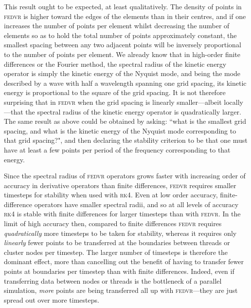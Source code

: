 This result ought to be expected, at least qualitatively. The density of points in \textsc{fedvr} is higher toward the edges of the elements than in their centres, and if one increases the number of points per element whilst decreasing the number of elements so as to hold the total number of points approximately constant, the smallest spacing between any two adjacent points will be inversely proportional to the number of points per element. We already know that in high-order finite differences or the Fourier method, the spectral radius of the kinetic energy operator is simply the kinetic energy of the Nyquist mode, and being the mode described by a wave with half a wavelength spanning one grid spacing, its kinetic energy is proportional to the square of the grid spacing. It is not therefore surprising that in \textsc{fedvr} when the grid spacing is linearly smaller---albeit locally---that the spectral radius of the kinetic energy operator is quadratically larger. The same result as above could be obtained by asking: ``what is the smallest grid spacing, and what is the kinetic energy of the Nyquist mode corresponding to that grid spacing?", and then declaring the stability criterion to be that one must have at least a few points per period of the frequency corresponding to that energy.

Since the spectral radius of \textsc{fedvr} operators grows faster with increasing order of accuracy in derivative operators than finite differences, \textsc{fedvr} requires smaller timesteps for stability when used with \textsc{rk4}. Even at low order accuracy, finite-difference operators have smaller spectral radii, and so at all levels of accuracy \textsc{rk4} is stable with finite differences for larger timesteps than with \textsc{fedvr}. In the limit of high accuracy then, compared to finite differences \textsc{fedvr} requires \emph{quadratically} more timesteps to be taken for stability, whereas it requires only \emph{linearly} fewer points to be transferred at the boundaries between threads or cluster nodes per timestep. The larger number of timesteps is therefore the dominant effect, more than cancelling out the benefit of having to transfer fewer points at boundaries per timestep than with finite differences. Indeed, even if transferring data between nodes or threads is the bottleneck of a parallel simulation, \emph{more} points are being transferred all up with \textsc{fedvr}---they are just spread out over more timesteps.

